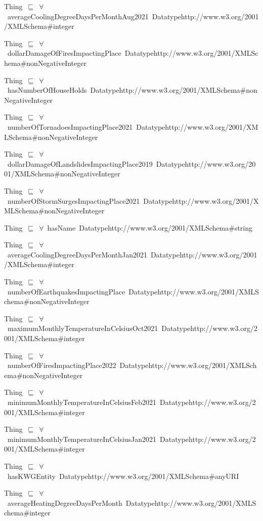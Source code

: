 \documentclass{article}
\begin{document}
Thing~\ensuremath{\sqsubseteq}~\ensuremath{\forall}~averageCoolingDegreeDaysPerMonthAug2021~Datatypehttp://www.w3.org/2001/XMLSchema#integer~

Thing~\ensuremath{\sqsubseteq}~\ensuremath{\forall}~dollarDamageOfFiresImpactingPlace~Datatypehttp://www.w3.org/2001/XMLSchema#nonNegativeInteger~

Thing~\ensuremath{\sqsubseteq}~\ensuremath{\forall}~hasNumberOfHouseHolds~Datatypehttp://www.w3.org/2001/XMLSchema#nonNegativeInteger~

Thing~\ensuremath{\sqsubseteq}~\ensuremath{\forall}~numberOfTornadoesImpactingPlace2021~Datatypehttp://www.w3.org/2001/XMLSchema#nonNegativeInteger~

Thing~\ensuremath{\sqsubseteq}~\ensuremath{\forall}~dollarDamageOfLandslidesImpactingPlace2019~Datatypehttp://www.w3.org/2001/XMLSchema#nonNegativeInteger~

Thing~\ensuremath{\sqsubseteq}~\ensuremath{\forall}~numberOfStormSurgesImpactingPlace2021~Datatypehttp://www.w3.org/2001/XMLSchema#nonNegativeInteger~

Thing~\ensuremath{\sqsubseteq}~\ensuremath{\forall}~hasName~Datatypehttp://www.w3.org/2001/XMLSchema#string~

Thing~\ensuremath{\sqsubseteq}~\ensuremath{\forall}~averageCoolingDegreeDaysPerMonthJan2021~Datatypehttp://www.w3.org/2001/XMLSchema#integer~

Thing~\ensuremath{\sqsubseteq}~\ensuremath{\forall}~numberOfEarthquakesImpactingPlace~Datatypehttp://www.w3.org/2001/XMLSchema#nonNegativeInteger~

Thing~\ensuremath{\sqsubseteq}~\ensuremath{\forall}~maximumMonthlyTemperatureInCelsiusOct2021~Datatypehttp://www.w3.org/2001/XMLSchema#integer~

Thing~\ensuremath{\sqsubseteq}~\ensuremath{\forall}~numberOfFiresImpactingPlace2022~Datatypehttp://www.w3.org/2001/XMLSchema#nonNegativeInteger~

Thing~\ensuremath{\sqsubseteq}~\ensuremath{\forall}~minimumMonthlyTemperatureInCelsiusFeb2021~Datatypehttp://www.w3.org/2001/XMLSchema#integer~

Thing~\ensuremath{\sqsubseteq}~\ensuremath{\forall}~minimumMonthlyTemperatureInCelsiusJan2021~Datatypehttp://www.w3.org/2001/XMLSchema#integer~

Thing~\ensuremath{\sqsubseteq}~\ensuremath{\forall}~hasKWGEntity~Datatypehttp://www.w3.org/2001/XMLSchema#anyURI~

Thing~\ensuremath{\sqsubseteq}~\ensuremath{\forall}~averageHeatingDegreeDaysPerMonth~Datatypehttp://www.w3.org/2001/XMLSchema#integer~
\end{document}
